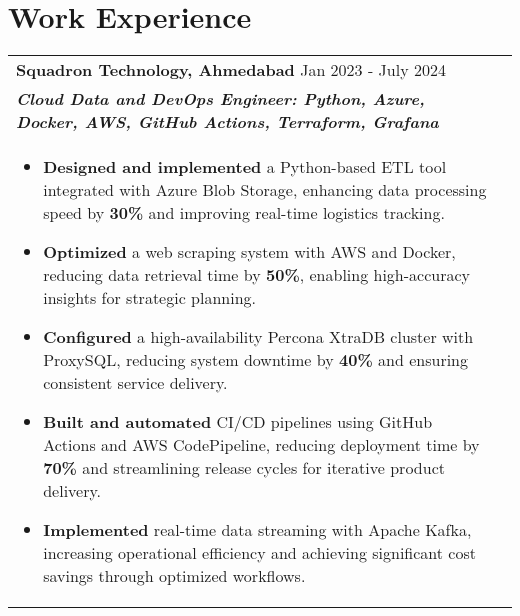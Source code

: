 \documentclass[a4paper,10pt]{article}
\begin{document}
\section{Work Experience}
\begin{tabularx}{\linewidth}{ @{}l r@{} }
\textbf{Squadron Technology, Ahmedabad} \hfill \color[HTML]{371e77} Jan 2023 - July 2024 \\[1pt]
\color[HTML]{371e77}\textbf{\textit{Cloud Data and DevOps Engineer: Python, Azure, Docker, AWS, GitHub Actions, Terraform, Grafana}} \\[1pt]
\begin{minipage}[t]{\linewidth}
\begin{itemize}[nosep, after=\strut, leftmargin=2em, itemsep=2pt]
\item \textbf{Designed and implemented} a Python-based ETL tool integrated with Azure Blob Storage, enhancing data processing speed by \textbf{30\%} and improving real-time logistics tracking.
\item \textbf{Optimized} a web scraping system with AWS and Docker, reducing data retrieval time by \textbf{50\%}, enabling high-accuracy insights for strategic planning.
\item \textbf{Configured} a high-availability Percona XtraDB cluster with ProxySQL, reducing system downtime by \textbf{40\%} and ensuring consistent service delivery.
\item \textbf{Built and automated} CI/CD pipelines using GitHub Actions and AWS CodePipeline, reducing deployment time by \textbf{70\%} and streamlining release cycles for iterative product delivery.
\item \textbf{Implemented} real-time data streaming with Apache Kafka, increasing operational efficiency and achieving significant cost savings through optimized workflows.
\end{itemize}
\end{minipage}

\end{tabularx}

\vspace{5pt}
\end{document}
